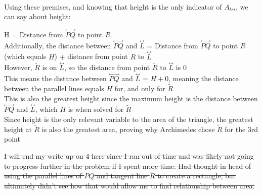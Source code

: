 \documentclass{article}
\begin{document}
\\
Using these premises, and knowing that height is the only indicator of $A_{tri}$, we can say about height:
\begin{center}
H = Distance from $\stackrel{\leftrightarrow}{PQ}$ to point $R$
\\
Additionally, the distance between $\stackrel{\leftrightarrow}{PQ}$ and $\stackrel{\leftrightarrow}{L}$ = Distance from $\stackrel{\leftrightarrow}{PQ}$ to point $R$ (which equals $H$) $+$ distance from point $R$ to $\stackrel{\leftrightarrow}{L}$
\\
However, $\tilde{R}$ is on $\stackrel{\leftrightarrow}{L}$, so the distance from point $\tilde{R}$ to $\stackrel{\leftrightarrow}{L}$ is 0
\\
This means the distance between $\stackrel{\leftrightarrow}{PQ}$ and $\stackrel{\leftrightarrow}{L}$ = $H + 0$, meaning the distance between the parallel lines equals $H$ for, and only for $\tilde{R}$
\\
This is also the greatest height since the maximum height is the distance between $\stackrel{\leftrightarrow}{PQ}$ and $\stackrel{\leftrightarrow}{L}$, which $H$ is when solved for $\tilde{R}$
\\
Since height is the only relevant variable to the area of the triangle, the greatest height at ${\tilde{R}}$ is also the greatest area, proving why Archimedes chose ${\tilde{R}}$ for the 3rd point 
\end{center}
\sout{I will end my write up on 4 here since I ran out of time and was likely not going to progress further in the problem if I spent more time. Had thought in head of using the parallel lines of $PQ$ and tangent line $\tilde{R}$ to create a rectangle, but ultimately didn't see how that would allow me to find relationship between area.}
\end{document}
